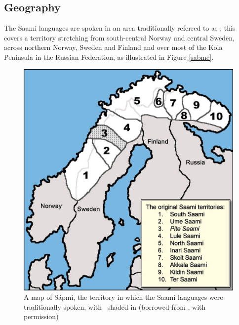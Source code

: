 \subsection{Geography}\label{geography}
The Saami languages are spoken in an area traditionally referred to as ; this covers a territory stretching from south-central Norway and central Sweden, across northern Norway, Sweden and Finland and over most of the Kola Peninsula in the Russian Federation, as illustrated in Figure \vref{sabme}. 
\begin{figure}
\centering
\includegraphics[width=.5\textwidth]{images/SaamiTerritoryMapPiteENsmall.jpg}
\caption[A map of , the territory in which the Saami Languages were traditionally spoken]{A map of Sápmi, the territory in which the Saami languages were traditionally spoken, with \PS\ shaded in (borrowed from \mbox{\citealt[]{BullEtal2007}}, with permission)}\label{sabme}
\end{figure}

